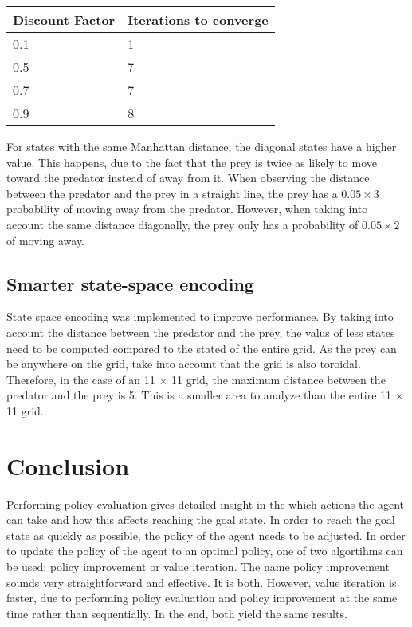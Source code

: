 \documentclass{article}
\begin{document}
\begin{center}
	\begin{tabular}{ l || l }
		Discount Factor & Iterations to converge \\ 
		\hline
		0.1 & 1 \\
		0.5 & 7 \\
		0.7 & 7 \\
		0.9 & 8 \\	
	\end{tabular}
\end{center}

For states with the same Manhattan distance, the diagonal states have a higher value. This happens, due to the fact that the prey is twice as likely to move toward the predator instead of away from it. When observing the distance between the predator and the prey in a straight line, the prey has a $0.05 \times 3$ probability of moving away from the predator. However, when taking into account the same distance diagonally, the prey only has a probability of $0.05 \times 2$ of moving away.

\subsection*{Smarter state-space encoding}
State space encoding was implemented to improve performance. By taking into account the distance between the predator and the prey, the valus of less states need to be computed compared to the stated of the entire grid. As the prey can be anywhere on the grid, take into account that the grid is also toroidal. Therefore, in the case of an 11 $\times$ 11 grid, the maximum distance between the predator and the prey is 5. This is a smaller area to analyze than the entire 11 $\times$ 11 grid.


\section*{Conclusion}
Performing policy evaluation gives detailed insight in the which actions the agent can take and how this affects reaching the goal state. In order to reach the goal state as quickly as possible, the policy of the agent needs to be adjusted. In order to update the policy of the agent to an optimal policy, one of two algortihms can be used: policy improvement or value iteration. The name policy improvement sounds very straightforward and effective. It is both. However, value iteration is faster, due to performing policy evaluation and policy improvement at the same time rather than sequentially. In the end, both yield the same results.
\end{document}

